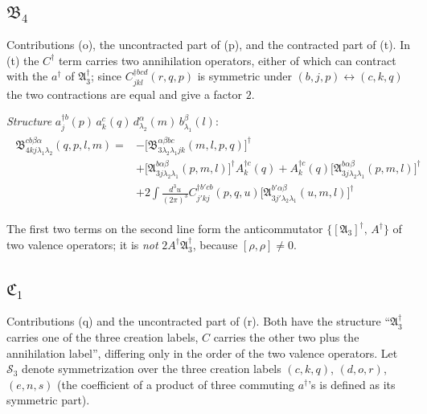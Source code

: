 \documentclass[11pt]{article}
\newcommand{\mf}{\mathfrak}
\newcommand{\dg}{\dagger}
\newcommand{\ip}[1]{\int\!\frac{d^{3}#1}{(2\pi)^{3}}}
\newcommand{\acomm}[2]{\big\{#1,\,#2\big\}}
\begin{document}
\subsection{$\mf B_{4}$}

Contributions (o), the uncontracted part of (p), and the contracted part of (t). In (t) the
$C^{\dg}$ term carries two annihilation operators, either of which can contract with the $a^{\dg}$
of $\mf A^{\dg}_{3}$; since $C^{\dg bcd}_{jkl}(r,q,p)$ is symmetric under
$(b,j,p)\leftrightarrow(c,k,q)$ the two contractions are equal and give a factor $2$.

\begin{res}
\emph{Structure} $a^{\dg b}_{j}(p)\,a^{c}_{k}(q)\,d^{\alpha}_{\lambda_{2}}(m)\,b^{\beta}_{\lambda_{1}}(l)$:
\begin{align}
\boxed{
\begin{aligned}
\mf B^{cb\beta\alpha}_{4kj\lambda_{1}\lambda_{2}}(q,p,l,m)
=&-\Big[\mf B^{\alpha\beta bc}_{3\lambda_{2}\lambda_{1}jk}(m,l,p,q)\Big]^{\dg}
\\
&+\Big[\mf A^{b\alpha\beta}_{3j\lambda_{2}\lambda_{1}}(p,m,l)\Big]^{\dg}A^{\dg c}_{k}(q)
+A^{\dg c}_{k}(q)\Big[\mf A^{b\alpha\beta}_{3j\lambda_{2}\lambda_{1}}(p,m,l)\Big]^{\dg}
\\
&+2\ip{u}C^{\dg b'cb}_{j'kj}(p,q,u)\Big[\mf A^{b'\alpha\beta}_{3j'\lambda_{2}\lambda_{1}}(u,m,l)\Big]^{\dg}
\end{aligned}}
\label{eq:B4}
\end{align}
\end{res}

\noindent
The first two terms on the second line form the anticommutator
$\acomm{[\mf A_{3}]^{\dg}}{A^{\dg}}$ of two valence operators; it is \emph{not} $2A^{\dg}\mf
A^{\dg}_{3}$, because $[\rho,\rho]\neq0$.

\subsection{$\mf C_{1}$}

Contributions (q) and the uncontracted part of (r). Both have the structure ``$\mf A^{\dg}_{3}$
carries one of the three creation labels, $C$ carries the other two plus the annihilation label'',
differing only in the order of the two valence operators. Let $\mathcal S_{3}$ denote
symmetrization over the three creation labels $(c,k,q)$, $(d,o,r)$, $(e,n,s)$ (the coefficient of
a product of three commuting $a^{\dg}$'s is defined as its symmetric part).
\end{document}
